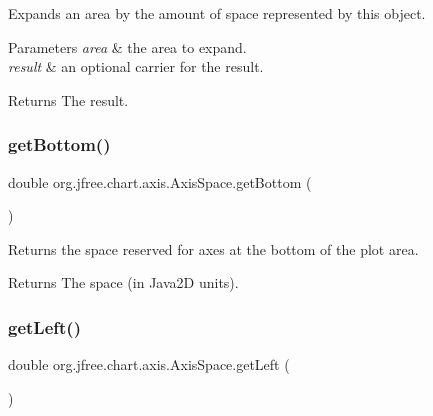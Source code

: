 Expands an area by the amount of space represented by this object.


\begin{DoxyParams}{Parameters}
{\em area} & the area to expand. \\
\hline
{\em result} & an optional carrier for the result.\\
\hline
\end{DoxyParams}
\begin{DoxyReturn}{Returns}
The result. 
\end{DoxyReturn}
\mbox{\label{classorg_1_1jfree_1_1chart_1_1axis_1_1_axis_space_a40abfcc343806c36e357168bf50814cc}} 
\subsubsection{\texorpdfstring{get\+Bottom()}{getBottom()}}
{\footnotesize\ttfamily double org.\+jfree.\+chart.\+axis.\+Axis\+Space.\+get\+Bottom (\begin{DoxyParamCaption}{ }\end{DoxyParamCaption})}

Returns the space reserved for axes at the bottom of the plot area.

\begin{DoxyReturn}{Returns}
The space (in Java2D units). 
\end{DoxyReturn}
\mbox{\label{classorg_1_1jfree_1_1chart_1_1axis_1_1_axis_space_af81c193f1268c9c3f4fddf2ce9b1f3f4}} 
\subsubsection{\texorpdfstring{get\+Left()}{getLeft()}}
{\footnotesize\ttfamily double org.\+jfree.\+chart.\+axis.\+Axis\+Space.\+get\+Left (\begin{DoxyParamCaption}{ }\end{DoxyParamCaption})}

